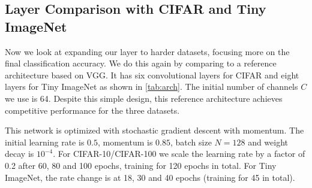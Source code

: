 


\subsection{Layer Comparison with CIFAR and Tiny ImageNet}\label{sec:conv_exp}
Now we look at expanding our layer to harder datasets, focusing more on the
final classification accuracy. We do this again by comparing to a reference
architecture based on VGG.
It has six convolutional layers for CIFAR and eight layers for Tiny ImageNet as shown in
\autoref{tab:arch}. The initial number of channels $C$ we use is 64. Despite
this simple design, this reference architecture achieves competitive performance
for the three datasets.

This network is optimized with stochastic gradient descent with momentum. The
initial learning rate is $0.5$, momentum is $0.85$, batch size $N=128$ and
weight decay is $10^{-4}$. For CIFAR-10/CIFAR-100 we scale the learning rate by
a factor of 0.2 after 60, 80 and 100 epochs, training for 120 epochs in total.
For Tiny ImageNet, the rate change is at 18, 30 and 40 epochs (training for 45 in total).

